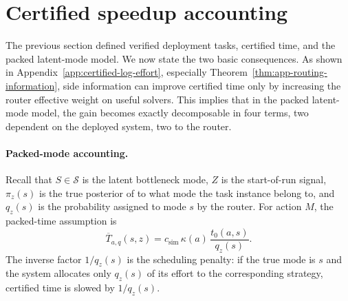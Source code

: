 \documentclass{article}
\newtheorem{remark}{Remark}
\newcommand{\cS}{\mathcal{S}}
\begin{document}




\section{Certified speedup accounting}
\label{sec:results}

The previous section defined verified deployment tasks, certified time, and the packed
latent-mode model.  We now state the two basic consequences.  As shown in Appendix~\ref{app:certified-log-effort}, especially Theorem~\ref{thm:app-routing-information}, side information can improve certified time only by increasing the router effective weight on useful solvers.  This implies that in the packed latent-mode model, the gain becomes exactly decomposable in four terms, two dependent on the deployed system, two to the router.

\paragraph{Packed-mode accounting.}
Recall that \(S\in\cS\) is the latent bottleneck mode, \(Z\) is the start-of-run signal, \(\pi_z(s)\) is the true posterior of to what mode the task instance belong to, and \(q_z(s)\) is the probability assigned to mode \(s\) by the router.
For action \(M\), the packed-time assumption is
\begin{equation}
\label{eq:effort-surrogate}
    \overline T_{a,q}(s,z)
    =
    c_{\mathrm{sim}}\,
    \kappa(a)\,
    \frac{t_0(a,s)}{q_z(s)} .
\end{equation}
The inverse factor \(1/q_z(s)\) is the scheduling penalty: if the true mode is \(s\) and
the system allocates only \(q_z(s)\) of its effort to the corresponding strategy, certified
time is slowed by \(1/q_z(s)\).
\end{document}
